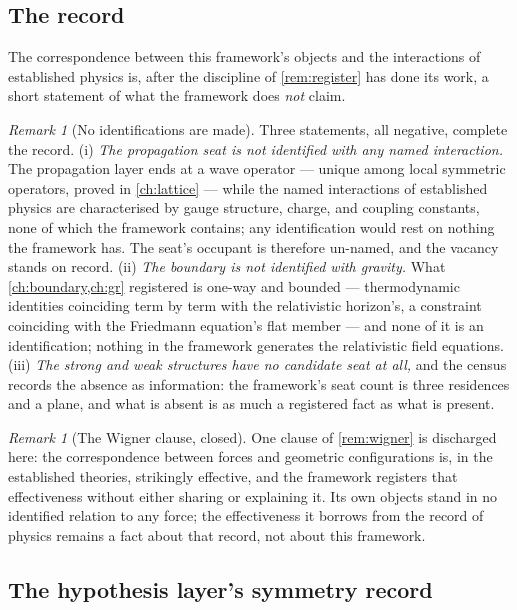 \documentclass[11pt]{amsbook}
\theoremstyle{plain}
\theoremstyle{definition}
\theoremstyle{remark}
\newtheorem{remark}[theorem]{Remark}
\begin{document}
\subsection{The record}\label{sec:correspondence-register}

The correspondence between this framework's objects and the interactions of established physics is, after the discipline of \cref{rem:register} has done its work, a short statement of what the framework does \emph{not} claim.

\begin{remark}[No identifications are made]\label{rem:autopsy}
Three statements, all negative, complete the record. (i) \emph{The propagation seat is not identified with any named interaction.} The propagation layer ends at a wave operator --- unique among local symmetric operators, proved in \cref{ch:lattice} --- while the named interactions of established physics are characterised by gauge structure, charge, and coupling constants, none of which the framework contains; any identification would rest on nothing the framework has. The seat's occupant is therefore un-named, and the vacancy stands on record. (ii) \emph{The boundary is not identified with gravity.} What \cref{ch:boundary,ch:gr} registered is one-way and bounded --- thermodynamic identities coinciding term by term with the relativistic horizon's, a constraint coinciding with the Friedmann equation's flat member --- and none of it is an identification; nothing in the framework generates the relativistic field equations. (iii) \emph{The strong and weak structures have no candidate seat at all,} and the census records the absence as information: the framework's seat count is three residences and a plane, and what is absent is as much a registered fact as what is present.
\end{remark}

\begin{remark}[The Wigner clause, closed]\label{rem:wigner-closed}
One clause of \cref{rem:wigner} is discharged here: the correspondence between forces and geometric configurations is, in the established theories, strikingly effective, and the framework registers that effectiveness without either sharing or explaining it. Its own objects stand in no identified relation to any force; the effectiveness it borrows from the record of physics remains a fact about that record, not about this framework.
\end{remark}

\subsection{The hypothesis layer's symmetry record}\label{sec:hypothesis-record}
\end{document}
